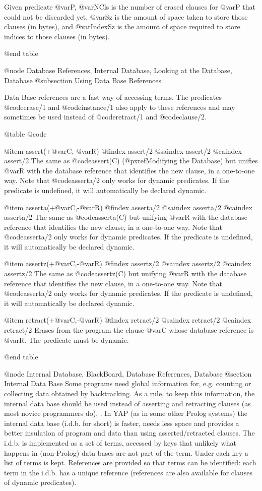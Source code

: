 {{{{{{Given predicate @var{P}, @var{NCls} is the number of erased clauses for
@var{P} that could not be discarded yet, @var{Sz} is the amount of space
taken to store those clauses (in bytes), and @var{IndexSz} is the amount
of space required to store indices to those clauses (in bytes).

@end table

@node Database References, Internal Database, Looking at the Database, Database
@subsection Using Data Base References

Data Base references are a fast way of accessing terms. The predicates
@code{erase/1} and @code{instance/1} also apply to these references and may
sometimes be used instead of @code{retract/1} and @code{clause/2}.

@table @code

@item assert(+@var{C},-@var{R})
@findex assert/2
@saindex assert/2
@caindex assert/2
 The same as @code{assert(C)} (@pxref{Modifying the Database}) but
unifies @var{R} with the  database reference that identifies the new
clause, in a one-to-one way. Note that @code{asserta/2} only works for dynamic
predicates. If the predicate is undefined, it will automatically be
declared dynamic.

@item asserta(+@var{C},-@var{R})
@findex asserta/2
@saindex asserta/2
@caindex asserta/2
 The same as @code{asserta(C)} but unifying @var{R} with
the  database reference that identifies the new clause, in a 
one-to-one way. Note that @code{asserta/2} only works for dynamic
predicates. If the predicate is undefined, it will automatically be
declared dynamic.

@item assertz(+@var{C},-@var{R})
@findex assertz/2
@saindex assertz/2
@caindex assertz/2
 The same as @code{assertz(C)} but unifying @var{R} with
the  database reference that identifies the new clause, in a 
one-to-one way. Note that @code{asserta/2} only works for dynamic
predicates. If the predicate is undefined, it will automatically be
declared dynamic.

@item retract(+@var{C},-@var{R})
@findex retract/2
@saindex retract/2
@caindex retract/2
 Erases from the program the clause @var{C} whose 
database reference is @var{R}. The predicate must be dynamic.


@end table

@node Internal Database, BlackBoard, Database References, Database
@section Internal Data Base
Some programs need global information for, e.g. counting or collecting 
data obtained by backtracking. As a rule, to keep this information, the
internal data base should be used instead of asserting and retracting
clauses (as most novice programmers  do), .
In YAP (as in some other Prolog systems) the internal data base (i.d.b. 
for short) is faster, needs less space and provides a better insulation of 
program and data than using asserted/retracted clauses.
The i.d.b. is implemented as a set of terms, accessed by keys that 
unlikely what happens in (non-Prolog) data bases are not part of the 
term. Under each key a list of terms is kept. References are provided so that 
terms can be identified: each term in the i.d.b. has a unique reference 
(references are also available for clauses of dynamic predicates).

}}}}}}
